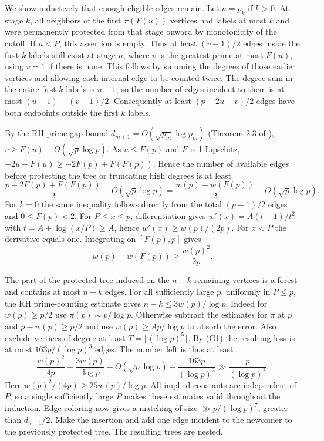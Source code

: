 We show inductively that enough eligible edges remain. Let $u=p_k$ if
$k>0$. At stage $k$, all neighbors of the first $\pi(F(u))$ vertices
had labels at most $k$ and were permanently protected from that stage
onward by monotonicity of the cutoff. If $u<P$, this assertion is empty.
Thus at least $(v-1)/2$ edges inside the first $k$ labels still exist
at stage $n$, where $v$ is the greatest prime at most $F(u)$, using $v=1$
if there is none. This follows by summing the degrees of those earlier
vertices and allowing each internal edge to be counted twice.
The degree sum in the entire first $k$ labels is $u-1$, so the number of
edges incident to them is at most $(u-1)-(v-1)/2$.
Consequently at least $(p-2u+v)/2$ edges have both endpoints outside
the first $k$ labels.

By the RH prime-gap bound $d_{m+1}=O(\sqrt{p_m}\log p_m)$
(Theorem 2.3 of \cite{graphEH}), $v\ge F(u)-O(\sqrt p\log p)$.
As $u\le F(p)$ and $F$ is 1-Lipschitz,
$-2u+F(u)\ge-2F(p)+F(F(p))$. Hence the number of available edges
before protecting the tree or truncating high degrees is at least
\[
 \frac{p-2F(p)+F(F(p))}{2}-O(\sqrt p\log p)
 =\frac{w(p)-w(F(p))}{2}-O(\sqrt p\log p).
\]
For $k=0$ the same inequality follows directly from the total
$(p-1)/2$ edges and $0\le F(p)<2$.
For $P\le x\le p$, differentiation gives
$w'(x)=A(t-1)/t^2$ with $t=A+\log(x/P)\ge A$, hence
$w'(x)\ge w(p)/(2p)$. For $x<P$ the derivative equals one.
Integrating on $[F(p),p]$ gives
\[
                      w(p)-w(F(p))\ge \frac{w(p)^2}{2p}.
\]

The part of the protected tree induced on the $n-k$ remaining vertices
is a forest and contains at most $n-k$ edges. For all sufficiently large
$p$, uniformly in $P\le p$, the RH prime-counting estimate gives
$n-k\le3w(p)/\log p$. Indeed for $w(p)\ge p/2$ use
$\pi(p)\sim p/\log p$. Otherwise subtract the estimates for $\pi$ at
$p$ and $p-w(p)\ge p/2$ and use $w(p)\ge Ap/\log p$ to absorb the error.
Also exclude vertices of degree at least $T=\lceil(\log p)^5\rceil$.
By (G1) the resulting loss is at most $163p/(\log p)^3$ edges.
The number left is thus at least
\[
 \frac{w(p)^2}{4p}-\frac{3w(p)}{\log p}
       -O(\sqrt p\log p)-\frac{163p}{(\log p)^3}
          \gg \frac{p}{(\log p)^2}.
\]
Here $w(p)^2/(4p)\ge25w(p)/\log p$. All implied constants are
independent of $P$, so a single sufficiently large $P$ makes these
estimates valid throughout the induction. Edge coloring now gives
a matching of size $\gg p/(\log p)^7$, greater than $d_{n+1}/2$.
Make the insertion and add one edge incident to the newcomer to the
previously protected tree. The resulting trees are nested.


